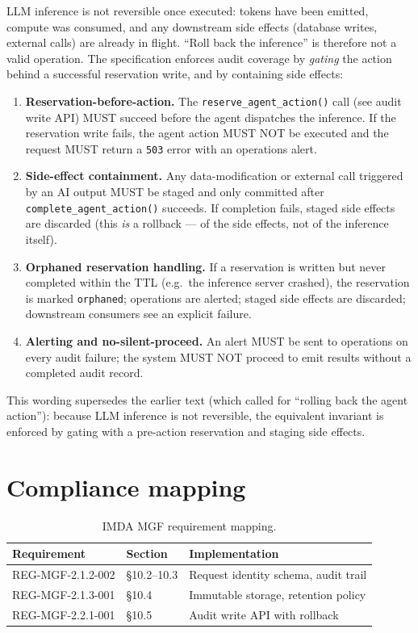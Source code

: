 LLM inference is not reversible once executed: tokens have been
emitted, compute was consumed, and any downstream side effects
(database writes, external calls) are already in flight. ``Roll
back the inference'' is therefore not a valid operation. The
specification enforces audit coverage by \emph{gating} the action
behind a successful reservation write, and by containing side
effects:

\begin{enumerate}
  \item \textbf{Reservation-before-action.} The
        \texttt{reserve\_agent\_action()} call (see audit write
        API) MUST succeed before the agent dispatches the
        inference. If the reservation write fails, the agent
        action MUST NOT be executed and the request MUST return a
        \texttt{503} error with an operations alert.
  \item \textbf{Side-effect containment.} Any data-modification or
        external call triggered by an AI output MUST be staged and
        only committed after \texttt{complete\_agent\_action()}
        succeeds. If completion fails, staged side effects are
        discarded (this \emph{is} a rollback --- of the side
        effects, not of the inference itself).
  \item \textbf{Orphaned reservation handling.} If a reservation
        is written but never completed within the TTL (e.g.\ the
        inference server crashed), the reservation is marked
        \texttt{orphaned}; operations are alerted; staged side
        effects are discarded; downstream consumers see an
        explicit failure.
  \item \textbf{Alerting and no-silent-proceed.} An alert MUST be
        sent to operations on every audit failure; the system
        MUST NOT proceed to emit results without a completed audit
        record.
\end{enumerate}

\noindent
This wording supersedes the earlier text (which called for
``rolling back the agent action''): because LLM inference is not
reversible, the equivalent invariant is enforced by gating with a
pre-action reservation and staging side effects.

\section{Compliance mapping}

\begin{table}[htbp]
\centering
\caption{IMDA MGF requirement mapping.}
\label{tab:mgf-mapping}
\footnotesize
\begin{tabularx}{\linewidth}{@{}l l X@{}}
\toprule
\textbf{Requirement} & \textbf{Section} & \textbf{Implementation} \\ \midrule
REG-MGF-2.1.2-002 & \S10.2--10.3 & Request identity schema, audit trail \\
REG-MGF-2.1.3-001 & \S10.4 & Immutable storage, retention policy \\
REG-MGF-2.2.1-001 & \S10.5 & Audit write API with rollback \\
\bottomrule
\end{tabularx}
\end{table}

